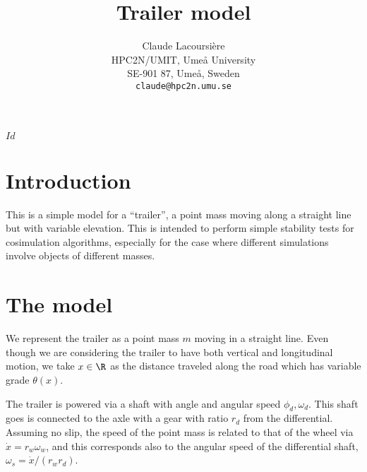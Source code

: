 \documentclass[10pt,notitlepage,abstracton]{scrartcl}
\title{Trailer model}
\author{Claude Lacoursi{\`{e}}re \\
  HPC2N/UMIT, Ume{\aa} University\\
  SE-901 87, Ume{\aa}, Sweden\\
  \texttt{claude@hpc2n.umu.se}
}
\theoremstyle{plain}
\theoremstyle{plain}
\theoremstyle{plain}
\begin{document}
\svnInfo $Id$
\maketitle{}
\svnId
\begin{abstract}

\end{abstract}

\section{Introduction}
\label{sec:introduction}

This is a simple model for a ``trailer'', a point mass moving along a
straight line but with variable elevation.   This is intended to perform
simple stability tests for cosimulation algorithms, especially for the case
where different simulations involve objects of different masses. 

\section{The model}
\label{sec:model}

We represent the trailer as a point mass $m$ moving in a straight line. Even
though we are considering the trailer to have both vertical and
longitudinal motion, we take $x\in\R$ as the distance traveled along the road
which has variable grade $\theta(x)$.  


The trailer is powered via a shaft with angle and angular speed
$\phi_{d},\omega_{d}$.  This shaft goes is connected to the axle
with a gear with ratio $r_{d}$ from the differential.  Assuming no
slip, the speed of the point mass is related to that of the wheel via
$\dot{x} = r_{w}\omega_{w}$, and this corresponds also to the angular speed
of the differential shaft, $\omega_{s} = \dot{x}/(r_{w}r_{d})$.
\end{document}

